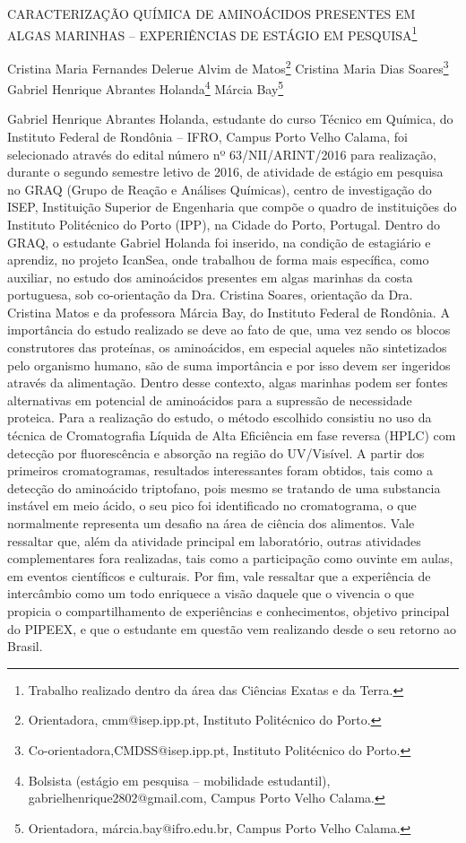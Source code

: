 \documentclass[article,12pt,onesidea,4paper,english,brazil]{abntex2}
\begin{document}
	
	
	\frenchspacing 
	
	\begin{center}
		\LARGE CARACTERIZAÇÃO QUÍMICA DE AMINOÁCIDOS PRESENTES EM ALGAS
		MARINHAS – EXPERIÊNCIAS DE ESTÁGIO EM PESQUISA\footnote{Trabalho realizado dentro da área das Ciências Exatas e da Terra.}
		
		\normalsize
	Cristina Maria Fernandes Delerue Alvim de Matos\footnote{Orientadora, cmm@isep.ipp.pt, Instituto Politécnico do Porto.} 
	Cristina Maria Dias Soares\footnote{Co-orientadora,CMDSS@isep.ipp.pt, Instituto Politécnico do Porto.} 
	Gabriel Henrique Abrantes Holanda\footnote{Bolsista (estágio em pesquisa – mobilidade estudantil), gabrielhenrique2802@gmail.com, Campus
		Porto Velho Calama.} 
	Márcia Bay\footnote{Orientadora, márcia.bay@ifro.edu.br, Campus Porto Velho Calama.} 
	\end{center}
	
	\noindent Gabriel Henrique Abrantes Holanda, estudante do curso Técnico em Química, do
	Instituto Federal de Rondônia – IFRO, Campus Porto Velho Calama, foi selecionado
	através do edital número nº 63/NII/ARINT/2016 para realização, durante o segundo
	semestre letivo de 2016, de atividade de estágio em pesquisa no GRAQ (Grupo de
	Reação e Análises Químicas), centro de investigação do ISEP, Instituição Superior
	de Engenharia que compõe o quadro de instituições do Instituto Politécnico do Porto
	(IPP), na Cidade do Porto, Portugal. Dentro do GRAQ, o estudante Gabriel Holanda
	foi inserido, na condição de estagiário e aprendiz, no projeto IcanSea, onde
	trabalhou de forma mais específica, como auxiliar, no estudo dos aminoácidos
	presentes em algas marinhas da costa portuguesa, sob co-orientação da Dra.
	Cristina Soares, orientação da Dra. Cristina Matos e da professora Márcia Bay, do
	Instituto Federal de Rondônia. A importância do estudo realizado se deve ao fato de
	que, uma vez sendo os blocos construtores das proteínas, os aminoácidos, em
	especial aqueles não sintetizados pelo organismo humano, são de suma importância
	e por isso devem ser ingeridos através da alimentação. Dentro desse contexto,
	algas marinhas podem ser fontes alternativas em potencial de aminoácidos para a
	supressão de necessidade proteica. Para a realização do estudo, o método
	escolhido consistiu no uso da técnica de Cromatografia Líquida de Alta Eficiência em
	fase reversa (HPLC) com detecção por fluorescência e absorção na região do
	UV/Visível. A partir dos primeiros cromatogramas, resultados interessantes foram
	obtidos, tais como a detecção do aminoácido triptofano, pois mesmo se tratando de
	uma substancia instável em meio ácido, o seu pico foi identificado no cromatograma,
	o que normalmente representa um desafio na área de ciência dos alimentos. Vale
	ressaltar que, além da atividade principal em laboratório, outras atividades
	complementares fora realizadas, tais como a participação como ouvinte em aulas,
	em eventos científicos e culturais. Por fim, vale ressaltar que a experiência de
	intercâmbio como um todo enriquece a visão daquele que o vivencia o que propicia
	o compartilhamento de experiências e conhecimentos, objetivo principal do PIPEEX,
	e que o estudante em questão vem realizando desde o seu retorno ao Brasil.
	
\end{document}
